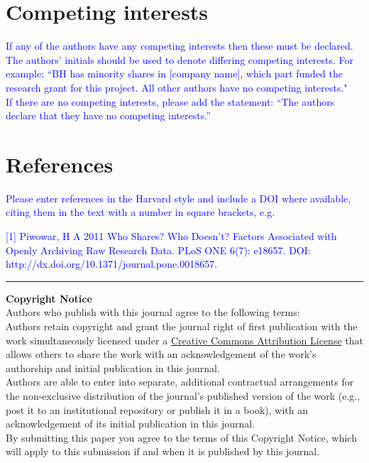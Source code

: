 \documentclass{jors}
\begin{document}
\section*{Competing interests}

\textcolor{blue}{If any of the authors have any competing interests then these must be declared. The authors’ initials should be used to denote differing competing interests. For example: “BH has minority shares in [company name], which part funded the research grant for this project. All other authors have no competing interests." \\
If there are no competing interests, please add the statement:
“The authors declare that they have no competing interests.” }

\section*{References}

\textcolor{blue}{Please enter references in the Harvard style and include a DOI where available, citing them in the text with a number in square brackets, e.g. \\ }

\textcolor{blue}{[1] Piwowar, H A 2011 Who Shares? Who Doesn't? Factors Associated with Openly Archiving Raw Research Data. PLoS ONE 6(7): e18657. DOI: \\ http://dx.doi.org/10.1371/journal.pone.0018657.}

\vspace{2cm}

\rule{\textwidth}{1pt}

{ \bf Copyright Notice} \\
Authors who publish with this journal agree to the following terms: \\

Authors retain copyright and grant the journal right of first publication with the work simultaneously licensed under a  \href{http://creativecommons.org/licenses/by/3.0/}{Creative Commons Attribution License} that allows others to share the work with an acknowledgement of the work's authorship and initial publication in this journal. \\

Authors are able to enter into separate, additional contractual arrangements for the non-exclusive distribution of the journal's published version of the work (e.g., post it to an institutional repository or publish it in a book), with an acknowledgement of its initial publication in this journal. \\

By submitting this paper you agree to the terms of this Copyright Notice, which will apply to this submission if and when it is published by this journal.
\end{document}
